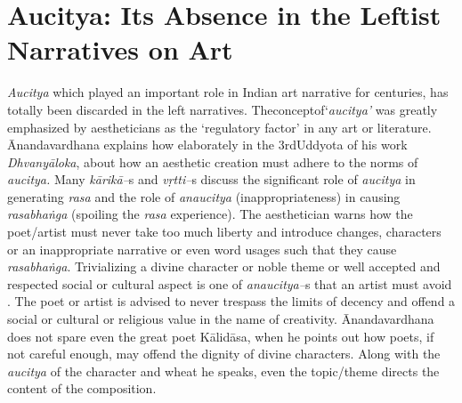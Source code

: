 \section*{Aucitya: Its Absence in the Leftist Narratives on Art}

\textit{Aucitya} which played an important role in Indian art narrative for centuries, has totally been discarded in the left narratives. Theconceptof‘\textit{aucitya’} was greatly emphasized by aestheticians as the ‘regulatory factor’ in any art or literature. Ānandavardhana explains how elaborately in the 3rdUddyota of his work \textit{Dhvanyāloka}, about how an aesthetic creation must adhere to the norms of \textit{aucitya.} Many \textit{kārikā–}s and \textit{vṛtti–}s discuss the significant role of \textit{aucitya} in generating \textit{rasa} and the role of \textit{anaucitya} (inappropriateness) in causing \textit{rasabhaṅga} (spoiling the \textit{rasa} experience). The aesthetician warns how the poet/artist must never take too much liberty and introduce changes, characters or an inappropriate narrative or even word usages such that they cause \textit{rasabhaṅga}. Trivializing a divine character or noble theme or well accepted and respected social or cultural aspect is one of \textit{anaucitya–}s that an artist must avoid . The poet or artist is advised to never trespass the limits of decency and offend a social or cultural or religious value in the name of creativity. Ānandavardhana does not spare even the great poet Kālidāsa, when he points out how poets, if not careful enough, may offend the dignity of divine characters.  Along with the \textit{aucitya} of the character and wheat he speaks, even the topic/theme directs the content of the composition. 

